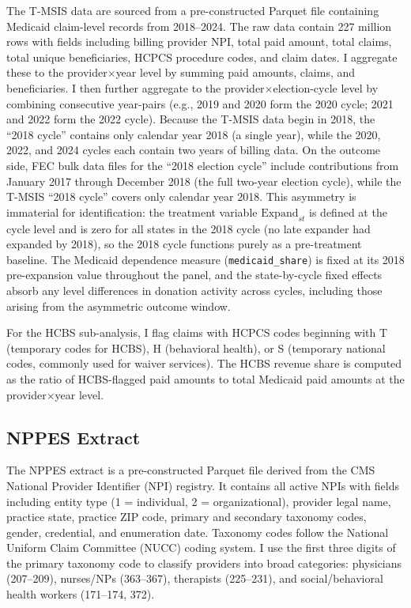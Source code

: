 \documentclass[12pt]{article}
\begin{document}
The T-MSIS data are sourced from a pre-constructed Parquet file containing Medicaid claim-level records from 2018--2024. The raw data contain 227 million rows with fields including billing provider NPI, total paid amount, total claims, total unique beneficiaries, HCPCS procedure codes, and claim dates. I aggregate these to the provider$\times$year level by summing paid amounts, claims, and beneficiaries. I then further aggregate to the provider$\times$election-cycle level by combining consecutive year-pairs (e.g., 2019 and 2020 form the 2020 cycle; 2021 and 2022 form the 2022 cycle). Because the T-MSIS data begin in 2018, the ``2018 cycle'' contains only calendar year 2018 (a single year), while the 2020, 2022, and 2024 cycles each contain two years of billing data. On the outcome side, FEC bulk data files for the ``2018 election cycle'' include contributions from January 2017 through December 2018 (the full two-year election cycle), while the T-MSIS ``2018 cycle'' covers only calendar year 2018. This asymmetry is immaterial for identification: the treatment variable $\text{Expand}_{st}$ is defined at the cycle level and is zero for all states in the 2018 cycle (no late expander had expanded by 2018), so the 2018 cycle functions purely as a pre-treatment baseline. The Medicaid dependence measure (\texttt{medicaid\_share}) is fixed at its 2018 pre-expansion value throughout the panel, and the state-by-cycle fixed effects absorb any level differences in donation activity across cycles, including those arising from the asymmetric outcome window.

For the HCBS sub-analysis, I flag claims with HCPCS codes beginning with T (temporary codes for HCBS), H (behavioral health), or S (temporary national codes, commonly used for waiver services). The HCBS revenue share is computed as the ratio of HCBS-flagged paid amounts to total Medicaid paid amounts at the provider$\times$year level.

\subsection{NPPES Extract}

The NPPES extract is a pre-constructed Parquet file derived from the CMS National Provider Identifier (NPI) registry. It contains all active NPIs with fields including entity type (1 = individual, 2 = organizational), provider legal name, practice state, practice ZIP code, primary and secondary taxonomy codes, gender, credential, and enumeration date. Taxonomy codes follow the National Uniform Claim Committee (NUCC) coding system. I use the first three digits of the primary taxonomy code to classify providers into broad categories: physicians (207--209), nurses/NPs (363--367), therapists (225--231), and social/behavioral health workers (171--174, 372).
\end{document}
